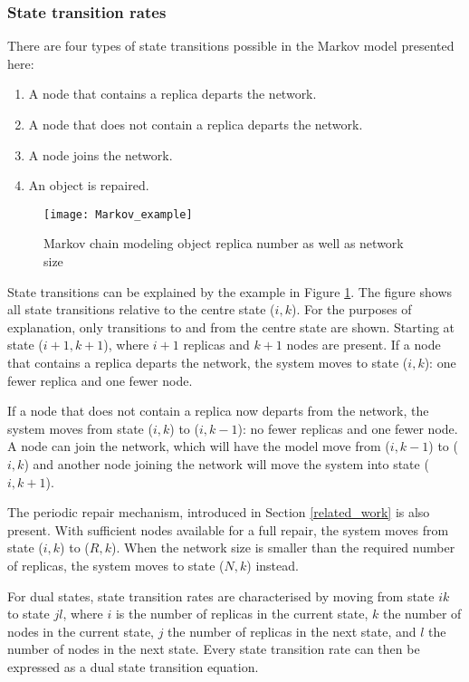 \subsubsection{State transition rates}

There are four types of state transitions possible in the Markov model presented here:
%
\begin{enumerate}
\item A node that contains a replica departs the network.
\item A node that does not contain a replica departs the network.
\item A node joins the network.
\item An object is repaired.
\end{enumerate}


\begin{figure}[htbp]
 \centering
 \texttt{[image: Markov\_example]}
 \caption{Markov chain modeling object replica number as well as network size}
 \label{fig_markov_example}
\end{figure}

State transitions can be explained by the example in Figure \ref{fig_markov_example}. The figure shows all state transitions relative to the centre state ($i,k$). For the purposes of explanation, only transitions to and from the centre state are shown. Starting at state ($i+1,k+1$), where $i+1$ replicas and $k+1$ nodes are present. If a node that contains a replica departs the network, the system moves to state ($i,k$): one fewer replica and one fewer node.

If a node that does not contain a replica now departs from the network, the system moves from state ($i,k$) to ($i,k-1$): no fewer replicas and one fewer node. A node can join the network, which will have the model move from ($i,k-1$) to ($i,k$) and another node joining the network will move the system into state ($i,k+1$).

The periodic repair mechanism, introduced in Section \ref{related_work} is also present. With sufficient nodes available for a full repair, the system moves from state ($i,k$) to ($R,k$). When the network size is smaller than the required number of replicas, the system moves to state ($N,k$) instead.

For dual states, state transition rates are characterised by moving from state $i k$ to state $j l$, where $i$ is the number of replicas in the current state, $k$ the number of nodes in the current state, $j$ the number of replicas in the next state, and $l$ the number of nodes in the next state. Every state transition rate can then be expressed as a dual state transition equation.

